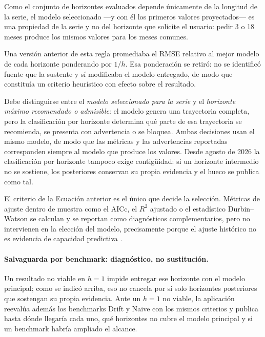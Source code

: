 \documentclass[12pt,letterpaper]{article}
\providecommand{\parencite}{\citep}
\begin{document}
Como el conjunto de horizontes evaluados depende únicamente de la longitud de la serie, el modelo seleccionado ---y con él los primeros valores proyectados--- es una propiedad de la serie y no del horizonte que solicite el usuario: pedir 3 o 18 meses produce los mismos valores para los meses comunes.

Una versión anterior de esta regla promediaba el RMSE relativo al mejor modelo de cada horizonte ponderando por \(1/h\). Esa ponderación se retiró: no se identificó fuente que la sustente y sí modificaba el modelo entregado, de modo que constituía un criterio heurístico con efecto sobre el resultado.

Debe distinguirse entre el \emph{modelo seleccionado para la serie} y el \emph{horizonte máximo recomendado o admisible}: el modelo genera una trayectoria completa, pero la clasificación por horizonte determina qué parte de esa trayectoria se recomienda, se presenta con advertencia o se bloquea. Ambas decisiones usan el mismo modelo, de modo que las métricas y las advertencias reportadas corresponden siempre al modelo que produce los valores. Desde agosto de 2026 la clasificación por horizonte tampoco exige contigüidad: si un horizonte intermedio no se sostiene, los posteriores conservan su propia evidencia y el hueco se publica como tal.

El criterio de la Ecuación anterior es el único que decide la selección. Métricas de ajuste dentro de muestra como el AICc, el \(R^2\) ajustado o el estadístico Durbin--Watson se calculan y se reportan como diagnósticos complementarios, pero no intervienen en la elección del modelo, precisamente porque el ajuste histórico no es evidencia de capacidad predictiva \parencite{granger_newbold1974}.

\paragraph{Salvaguarda por benchmark: diagnóstico, no sustitución.} Un resultado no viable en \(h=1\) impide entregar ese horizonte con el modelo principal; como se indicó arriba, eso no cancela por sí solo horizontes posteriores que sostengan su propia evidencia. Ante un \(h=1\) no viable, la aplicación reevalúa además los benchmarks Drift y Naive con los mismos criterios y publica hasta dónde llegaría cada uno, qué horizontes no cubre el modelo principal y si un benchmark habría ampliado el alcance.
\end{document}
